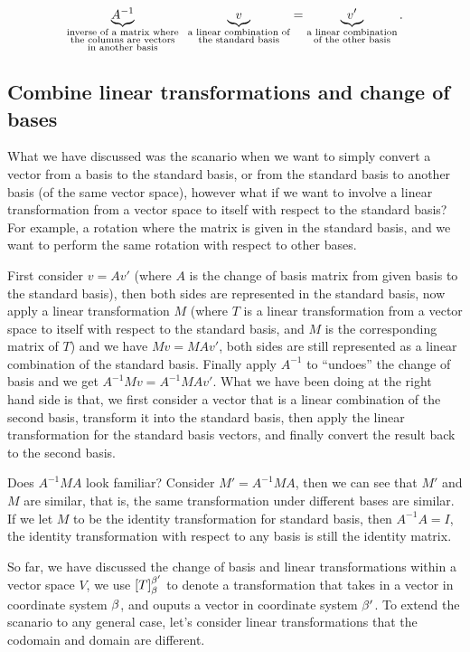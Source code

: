 \documentclass[11pt, cyan, night, 1in]{LatexTemplate/hw}
\begin{document}
\[\underbrace{A^{-1}}_{\substack{\text{inverse of a matrix where}\\\text{the columns are vectors}\\\text{in another basis}}}\;\;\underbrace{v}_{\substack{\text{a linear combination of} \\\text{the standard basis}}} = \underbrace{v'}_{\substack{\text{a linear combination}\\\text{of the other basis}}}.\]

\subsection{Combine linear transformations and change of bases}

What we have discussed was the scanario when we want to simply convert a vector from a basis to the standard basis, or from the standard basis to another basis (of the same vector space), however what if we want to involve a linear transformation from a vector space to itself with respect to the standard basis? For example, a rotation where the matrix is given in the standard basis, and we want to perform the same rotation with respect to other bases. 

First consider $v=Av'$ (where $A$ is the change of basis matrix from given basis to the standard basis), then both sides are represented in the standard basis, now apply a linear transformation $M$ (where $T$ is a linear transformation from a vector space to itself with respect to the standard basis, and $M$ is the corresponding matrix of $T$) and we have $Mv=MAv'$, both sides are still represented as a linear combination of the standard basis. Finally apply $A^{-1}$ to ``undoes'' the change of basis and we get $A^{-1}Mv=A^{-1}MAv'$. What we have been doing at the right hand side is that, we first consider a vector that is a linear combination of the second basis, transform it into the standard basis, then apply the linear transformation for the standard basis vectors, and finally convert the result back to the second basis.

Does $A^{-1}MA$ look familiar? Consider $M'=A^{-1}MA$, then we can see that $M'$ and $M$ are similar, that is, the same transformation under different bases are similar. If we let $M$ to be the identity transformation for standard basis, then $A^{-1}A=I$, the identity transformation with respect to any basis is still the identity matrix. 

So far, we have discussed the change of basis and linear transformations within a vector space $V$, we use $[T]_\beta^{\beta'}$ to denote a transformation that takes in a vector in coordinate system $\beta$, and ouputs a vector in coordinate system $\beta'$. To extend the scanario to any general case, let's consider linear transformations that the codomain and domain are different.
\end{document}
